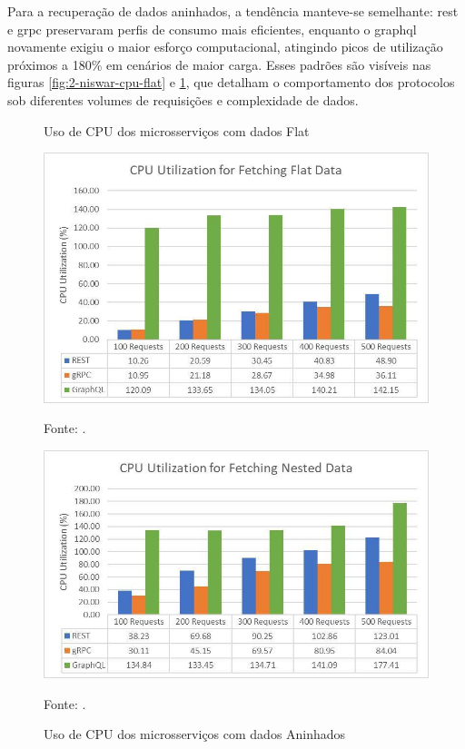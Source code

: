Para a recuperação de dados aninhados, a tendência manteve-se semelhante: \gls{rest} e \gls{grpc} preservaram perfis de consumo mais eficientes, enquanto o \acrshort{graphql} novamente exigiu o maior esforço computacional, atingindo picos de utilização próximos a 180\% em cenários de maior carga. Esses padrões são visíveis nas figuras \ref{fig:2-niswar-cpu-flat} e \ref{fig:2-niswar-cpu-nested}, que detalham o comportamento dos protocolos sob diferentes volumes de requisições e complexidade de dados.

\begin{figure}[htb]
  \centering
  \begin{minipage}[t]{0.48\linewidth}
    \caption{Uso de CPU dos microsserviços com dados Flat}
    \label{fig:2-niswar-cpu-flat}
    \centering
    \includegraphics[width=\linewidth]{imagens/niswar_cpu_flat.jpg}    
    {\par \raggedright \footnotesize Fonte: \textcite{niswar_performance_2024}.\par}
  \end{minipage}%
  \hfill
  \begin{minipage}[t]{0.48\linewidth}
    \caption{Uso de CPU dos microsserviços com dados Aninhados}
    \label{fig:2-niswar-cpu-nested}
    \centering
    \includegraphics[width=\linewidth]{imagens/niswar_cpu_nested.jpg}    
    {\par \raggedright \footnotesize Fonte: \textcite{niswar_performance_2024}.\par}
  \end{minipage}
\end{figure}

